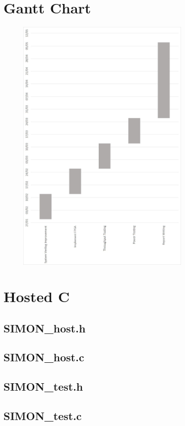 \documentclass[12pt,twoside,a4paper]{report}
\begin{document}
    \chapter{Gantt Chart}
        \begin{figure}[H]
			\includegraphics[width=0.75\textwidth]{Gantt_Chart}
			\centering
			\label{Gantt_Chart}
		\end{figure}
		
	\chapter{Hosted C}
	\section*{SIMON\_host.h}
	    
	\pagebreak
	\section*{SIMON\_host.c}
	    
	\pagebreak
	\section*{SIMON\_test.h}
	    
	\section*{SIMON\_test.c}
	    
	\pagebreak
     
\end{document}
